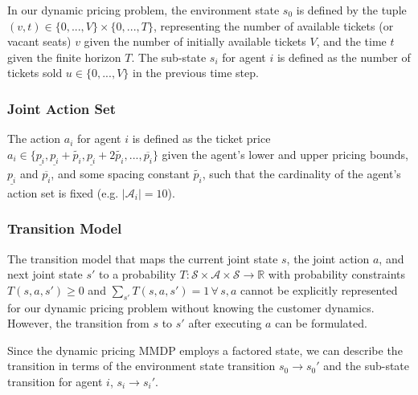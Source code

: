 \documentclass[letterpaper]{article}%
\begin{document}
In our dynamic pricing problem, the environment state $s_0$ is defined by the tuple $(v, t) \in \{0, ..., V\} \times \{0, ..., T\}$, representing the number of available tickets (or vacant seats) $v$ given the number of initially available tickets $V$, and the time $t$ given the finite horizon $T$. The sub-state $s_i$ for agent $i$ is defined as the number of tickets sold $u \in \{0, ..., V\}$ in the previous time step.

\subsubsection{Joint Action Set}

The action $a_i$ for agent $i$ is defined as the ticket price $a_i \in \{ \underline{p_i}, \underline{p_i}+\tilde{p_i}, \underline{p_i}+2\tilde{p_i}, ..., \overline{p_i} \}$ given the agent's lower and upper pricing bounds, $\underline{p_i}$ and $\overline{p_i}$, and some spacing constant $\tilde{p_i}$, such that the cardinality of the agent's action set is fixed (e.g. $|\mathcal{A}_i| = 10$).

\subsubsection{Transition Model}

The transition model that maps the current joint state $s$, the joint action $a$, and next joint state $s'$ to a probability $T:\mathcal{S} \times \mathcal{A} \times \mathcal{S} \rightarrow \mathbb{R}$ with probability constraints $T(s,a,s')\geq 0$ and $\sum_{s'} T(s,a,s') = 1 \, \forall \, s,a$ cannot be explicitly represented for our dynamic pricing problem without knowing the customer dynamics. However, the transition from $s$ to $s'$ after executing $a$ can be formulated. 

Since the dynamic pricing MMDP employs a factored state, we can describe the transition in terms of the environment state transition $s_0 \rightarrow s_0'$ and the sub-state transition for agent $i$, $s_i \rightarrow s_i'$. 
\end{document}
